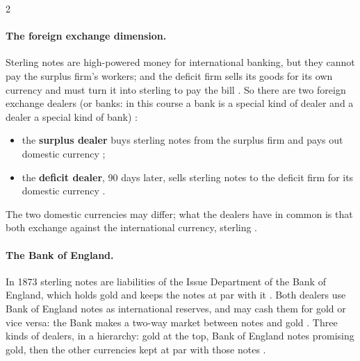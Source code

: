 \begin{paracol}{2}
\paragraph{The foreign exchange dimension.} Sterling notes are high-powered money for international banking, but they cannot pay the surplus firm's workers;
and the deficit firm sells its goods for its own currency and must turn it into sterling to pay the bill . So
there are two foreign exchange dealers (or banks: in this course a bank is a special kind of dealer and a dealer a special kind of bank)
:
\begin{itemize}
  \item the \textbf{surplus dealer} buys sterling notes from the surplus firm and pays out domestic currency ;
  \item the \textbf{deficit dealer}, 90 days later, sells sterling notes to the deficit firm for its domestic currency .
\end{itemize}
The two domestic currencies may differ; what the dealers have in common is that both exchange against the international currency, sterling .

\paragraph{The Bank of England.} In 1873 sterling notes are liabilities of the Issue Department of the Bank of England, which holds gold and keeps the notes at par
with it . Both dealers use Bank of England notes as international reserves, and may cash them for gold or vice versa: the Bank makes a two-way
market between notes and gold . Three kinds of dealers, in a hierarchy: gold at the top, Bank of
England notes promising gold, then the other currencies kept at par with those notes .

\begin{nfigure}
\begin{taccts}
\quad
{}\quad
{}
\end{taccts}
\begin{taccts}
\quad
{}\quad
{}
\end{taccts}
\caption{International trade finance in 1873, as drawn in class .}\label{fig:gl-taccts}
\end{nfigure}


\end{paracol}
